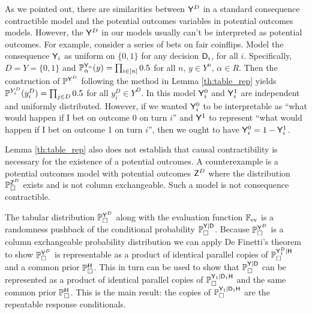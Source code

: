 As we pointed out, there are similarities between $\mathsf{Y}^D$ in a standard consequence contractible model and the potential outcomes variables in potential outcomes models. However, the $\mathsf{Y}^D$ in our models usually can't be interpreted as potential outcomes. For example, consider a series of bets on fair coinflips. Model the consequence $\mathsf{Y}_i$ as uniform on $\{0,1\}$ for any decision $\mathsf{D}_i$, for all $i$. Specifically, $D=Y=\{0,1\}$ and $\mathbb{P}_\alpha^{\mathsf{Y}_n}(y)=\prod_{i\in [n]} 0.5$ for all $n$, $y\in Y^n$, $\alpha\in R$. Then the construction of $\mathbb{P}^{\mathsf{Y}^D}$ following the method in Lemma \ref{th:table_rep} yields $\mathbb{P}^{Y^D_i}(y^D_i)=\prod_{j\in D} 0.5$ for all $y^D_i\in Y^D$. In this model $\mathsf{Y}^0_i$ and $\mathsf{Y}^1_i$ are independent and uniformly distributed. However, if we wanted $\mathsf{Y}^0_i$ to be interpretable as ``what would happen if I bet on outcome 0 on turn $i$'' and $\mathsf{Y}^1$ to represent ``what would happen if I bet on outcome 1 on turn $i$'', then we ought to have $\mathsf{Y}^0_i = 1-\mathsf{Y}^1_i$. 

Lemma \ref{th:table_rep} also does not establish that causal contractibility is necessary for the existence of a potential outcomes. A counterexample is a potential outcomes model with potential outcomes $\mathsf{Z}^D$ where the distribution $\mathbb{P}_\square^{\mathsf{Z}^D}$ exists and is not column exchangeable. Such a model is not consequence contractible.

The tabular distribution $\mathbb{P}_\square^{\mathsf{Y}^D}$ along with the evaluation function $\mathbb{F}_{\text{ev}}$ is a randomness pushback of the conditional probability $\mathbb{P}_\square^{\mathsf{Y}|\mathsf{D}}$. Because $\mathbb{P}_\square^{\mathsf{Y}^D}$ is a column exchangeable probability distribution we can apply De Finetti's theorem to show $\mathbb{P}_\square^{\mathsf{Y}^D}$ is representable as a product of identical parallel copies of $\mathbb{P}_\square^{\mathsf{Y}_1^D|\mathsf{H}}$ and a common prior $\mathbb{P}_\square^{\mathsf{H}}$. This in turn can be used to show that $\mathbb{P}_\square^{\mathsf{Y}|\mathsf{D}}$ can be represented as a product of identical parallel copies of $\mathbb{P}_\square^{\mathsf{Y}_1|\mathsf{D}_1\mathsf{H}}$ and the same common prior $\mathbb{P}_\square^{\mathsf{H}}$. This is the main result: the copies of $\mathbb{P}_\square^{\mathsf{Y}_1|\mathsf{D}_1\mathsf{H}}$ are the repeatable response conditionals.

